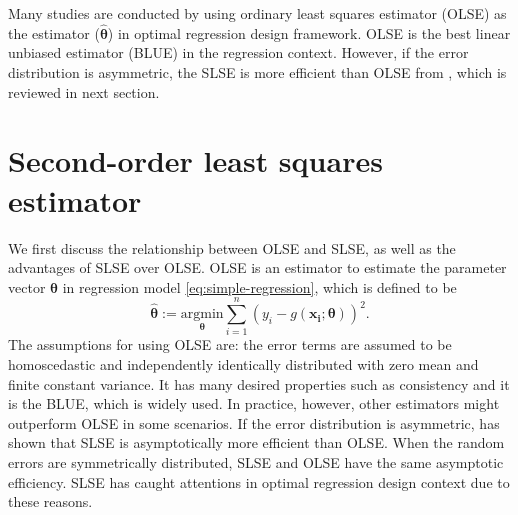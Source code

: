 \documentclass[
]{book}
\theoremstyle{definition}
\theoremstyle{definition}
\theoremstyle{definition}
\theoremstyle{definition}
\theoremstyle{remark}
\begin{document}
Many studies are conducted by using ordinary least squares estimator (OLSE) as the estimator (\(\hat{\boldsymbol{\theta}}\)) in optimal regression design framework. OLSE is the best linear unbiased estimator (BLUE) in the regression context. However, if the error distribution is asymmetric, the SLSE is more efficient than OLSE from \citet{wang2008second}, which is reviewed in next section.

\section{Second-order least squares estimator}\label{section-SLSE}

We first discuss the relationship between OLSE and SLSE, as well as the advantages of SLSE over OLSE. OLSE is an estimator to estimate the parameter vector \(\boldsymbol{\theta}\) in regression model \eqref{eq:simple-regression}, which is defined to be
\begin{equation*}
\boldsymbol{\hat{\theta}}:=\underset{\boldsymbol{\theta}}{\mathrm{argmin}}\sum_{i=1}^n 
(y_i-g(\boldsymbol{x_i};\boldsymbol{\theta}) )^2. 
\end{equation*}
The assumptions for using OLSE are: the error terms are assumed to be homoscedastic and independently identically distributed with zero mean and finite constant variance. It has many desired properties such as consistency and it is the BLUE, which is widely used. In practice, however, other estimators might outperform OLSE in some scenarios. If the error distribution is asymmetric, \citet{wang2008second} has shown that SLSE is asymptotically more efficient than OLSE. When the random errors are symmetrically distributed, SLSE and OLSE have the same asymptotic efficiency. SLSE has caught attentions in optimal regression design context due to these reasons.
\end{document}
